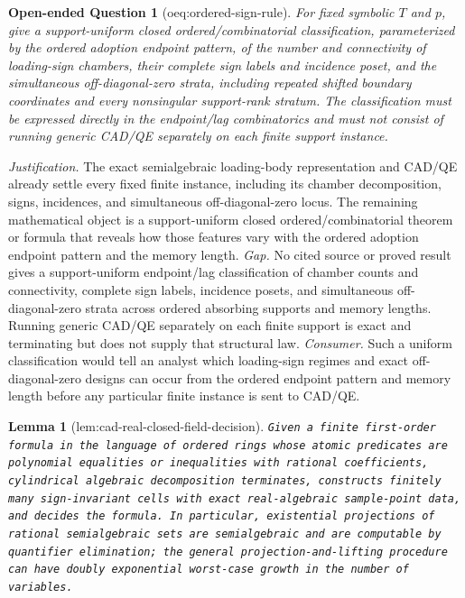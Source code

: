 \documentclass{article}
\newtheorem{lemma}{Lemma}
\newtheorem{openendedquestion}{Open-ended Question}
\begin{document}
\begin{openendedquestion}[oeq:ordered-sign-rule]\label{oeq:ordered-sign-rule}
For fixed symbolic \(T\) and \(p\), give a support-uniform closed ordered/combinatorial classification, parameterized by the ordered adoption endpoint pattern, of the number and connectivity of loading-sign chambers, their complete sign labels and incidence poset, and the simultaneous off-diagonal-zero strata, including repeated shifted boundary coordinates and every nonsingular support-rank stratum. The classification must be expressed directly in the endpoint/lag combinatorics and must not consist of running generic CAD/QE separately on each finite support instance.
\end{openendedquestion}
\par\smallskip\noindent \textit{Justification.} The exact semialgebraic loading-body representation and CAD/QE already settle every fixed finite instance, including its chamber decomposition, signs, incidences, and simultaneous off-diagonal-zero locus.  The remaining mathematical object is a support-uniform closed ordered/combinatorial theorem or formula that reveals how those features vary with the ordered adoption endpoint pattern and the memory length. \textit{Gap.} No cited source or proved result gives a support-uniform endpoint/lag classification of chamber counts and connectivity, complete sign labels, incidence posets, and simultaneous off-diagonal-zero strata across ordered absorbing supports and memory lengths.  Running generic CAD/QE separately on each finite support is exact and terminating but does not supply that structural law. \textit{Consumer.} Such a uniform classification would tell an analyst which loading-sign regimes and exact off-diagonal-zero designs can occur from the ordered endpoint pattern and memory length before any particular finite instance is sent to CAD/QE.

\begin{lemma}[lem:cad-real-closed-field-decision]\label{lem:cad-real-closed-field-decision}
\texttt{Given a finite first-\allowbreak{}order formula in the language of ordered rings whose atomic predicates are polynomial equalities or inequalities with rational coefficients,\allowbreak{} cylindrical algebraic decomposition terminates,\allowbreak{} constructs finitely many sign-\allowbreak{}invariant cells with exact real-\allowbreak{}algebraic sample-\allowbreak{}point data,\allowbreak{} and decides the formula.  In particular,\allowbreak{} existential projections of rational semialgebraic sets are semialgebraic and are computable by quantifier elimination;\allowbreak{} the general projection-\allowbreak{}and-\allowbreak{}lifting procedure can have doubly exponential worst-\allowbreak{}case growth in the number of variables.}
\end{lemma}
\end{document}
